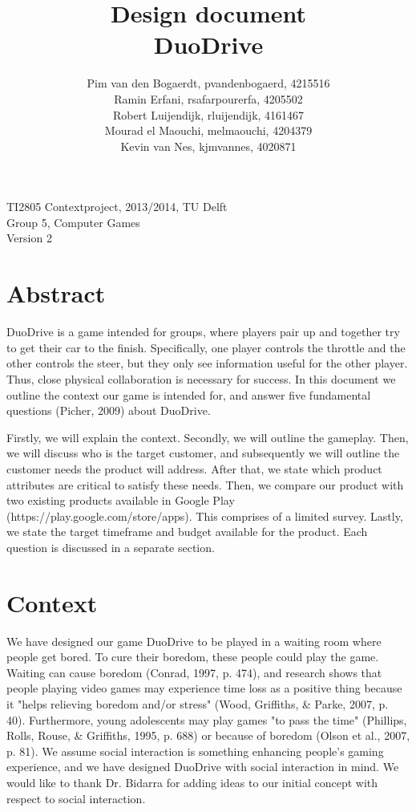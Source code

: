 \documentclass[11pt,twoside,a4paper]{article}
\title{
  Design document\\
  DuoDrive
}
\author{
	Pim van den Bogaerdt, pvandenbogaerd, 4215516\\
	Ramin Erfani, rsafarpourerfa, 4205502\\
	Robert Luijendijk, rluijendijk, 4161467\\
	Mourad el Maouchi, melmaouchi, 4204379\\
	Kevin van Nes, kjmvannes, 4020871
}
\begin{document}
\maketitle
\begin{center}
TI2805 Contextproject, 2013/2014, TU Delft\\
Group 5, Computer Games\\
Version 2
\end{center}
\clearpage

\section*{Abstract}
DuoDrive is a game intended for groups, where players pair up and together try to get their car to the finish. Specifically, one player controls the throttle and the other controls the steer, but they only see information useful for the other player. Thus, close physical collaboration is necessary for success. In this document we outline the context our game is intended for, and answer five fundamental questions (Picher, 2009) about DuoDrive.

Firstly, we will explain the context. Secondly, we will outline the gameplay. Then, we will discuss who is the target customer, and subsequently we will outline the customer needs the product will address. After that, we state which product attributes are critical to satisfy these needs. Then, we compare our product with two existing products available in Google Play (https://play.google.com/store/apps). This comprises of a limited survey. Lastly, we state the target timeframe and budget available for the product. Each question is discussed in a separate section.

\clearpage
\tableofcontents

\clearpage

\section{Context}
We have designed our game DuoDrive to be played in a waiting room where people get bored. To cure their boredom, these people could play the game. Waiting can cause boredom (Conrad, 1997, p. 474), and research shows that people playing video games may experience time loss as a positive thing because it "helps relieving boredom and/or stress" (Wood, Griffiths, \& Parke, 2007, p. 40). Furthermore, young adolescents may play games "to pass the time" (Phillips, Rolls, Rouse, \& Griffiths, 1995, p. 688) or because of boredom (Olson et al., 2007, p. 81). We assume social interaction is something enhancing people's gaming experience, and we have designed DuoDrive with social interaction in mind. We would like to thank Dr. Bidarra for adding ideas to our initial concept with respect to social interaction.
\end{document}
